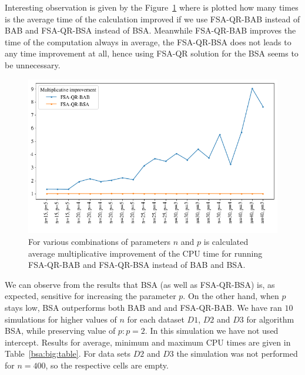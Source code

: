 Interesting observation is given by the Figure~\ref{exact:improvement} where is plotted how many times is the average time of the calculation improved if we use FSA-QR-BAB instead of BAB and FSA-QR-BSA instead of BSA. Meanwhile FSA-QR-BAB improves the time of the computation always in average, the FSA-QR-BSA does not leads to any time improvement at all, hence using FSA-QR solution for the BSA seems to be unnecessary.
 
\begin{figure}[h]
    \centering
    \includegraphics[width=12cm]{img/exact_improvement}

    \caption{For various combinations of parameters $n$ and $p$ is calculated average multiplicative improvement of the CPU time for running FSA-QR-BAB and FSA-QR-BSA instead of BAB and BSA.}
    \label{exact:improvement}

    
\end{figure}


We can observe from the results that BSA (as well as FSA-QR-BSA) is, as expected, sensitive for increasing the parameter $p$. On the other hand, when $p$ stays low, BSA outperforms both BAB and and FSA-QR-BAB. We have ran $10$ simulations for higher values of $n$ for each dataset $D1$, $D2$ and $D3$ for algorithm BSA, while preserving value of $p: p = 2$. In this simulation we have not used intercept. Results for average, minimum and maximum CPU times are given in Table~\ref{bsa:big:table}. For data sets $D2$ and $D3$ the simulation was not performed for $n = 400$, so the 
respective cells are empty.



